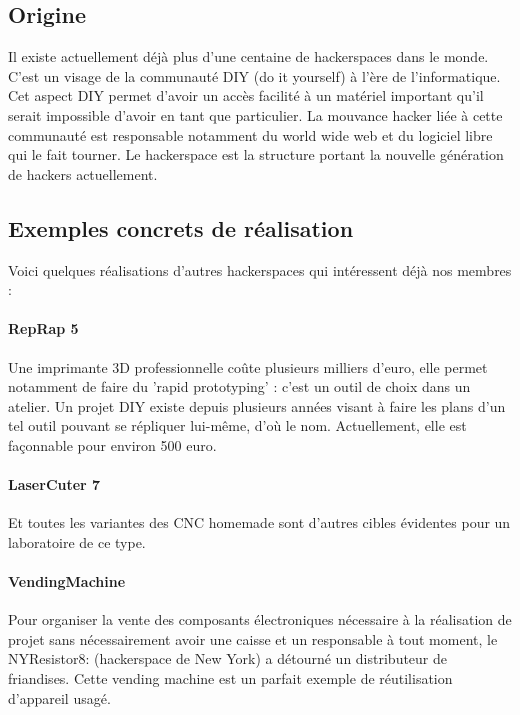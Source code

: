 \documentclass[a4paper]{article}
\begin{document}
        \subsection*{Origine} %
         Il existe actuellement déjà plus d’une centaine de hackerspaces dans le monde.
         C’est un visage de la communauté DIY (do it yourself) à l’ère de  l’informatique. 
Cet aspect DIY permet d’avoir un accès facilité à un  matériel important qu’il serait impossible d’avoir en tant que  particulier. 
La mouvance hacker liée à cette communauté est  responsable notamment du world wide web et du logiciel libre qui le fait  tourner. 
Le hackerspace est la structure portant la nouvelle  génération de hackers actuellement.

        \subsection*{Exemples concrets de réalisation}
Voici quelques réalisations d’autres hackerspaces qui intéressent déjà nos membres :

\paragraph{RepRap 5} Une  imprimante 3D professionnelle coûte plusieurs milliers d’euro, elle  permet notamment de faire du ’rapid prototyping’ : c’est un outil de  choix dans un atelier. Un projet DIY existe depuis plusieurs années  visant à faire les plans d’un tel outil pouvant se répliquer  lui-même, d’où le nom. Actuellement, elle est façonnable pour environ  500 euro.

\paragraph{LaserCuter 7} Et toutes les variantes des CNC homemade sont d’autres cibles évidentes pour un laboratoire de ce type.

\paragraph{VendingMachine}  Pour organiser la vente des composants électroniques nécessaire à la  réalisation de projet sans nécessairement avoir une caisse et un  responsable à tout moment, le NYResistor8:  (hackerspace de New York) a détourné un distributeur de friandises.  Cette vending machine est un parfait exemple de réutilisation  d’appareil usagé.
\end{document}
